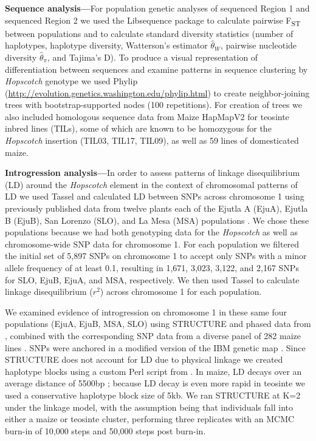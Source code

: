 \documentclass[11pt]{article} %
\begin{document}
\begin{linenumbers}
\begin{flushleft}
\textbf{Sequence analysis---}For population genetic analyses of sequenced Region 1 and sequenced Region 2 we used the  Libsequence package \citep{Thornton2003} to calculate pairwise F\textsubscript{ST} between populations and to calculate standard diversity statistics (number of haplotypes, haplotype diversity, Watterson's estimator $\hat\theta_W$, pairwise nucleotide diversity $\hat\theta_\pi$, and Tajima's D). To produce a visual representation of differentiation between sequences and examine patterns in sequence clustering by \emph{Hopscotch} genotype we used Phylip (\url{http://evolution.genetics.washington.edu/phylip.html}) to create neighbor-joining trees with bootstrap-supported nodes (100 repetitions). For creation of trees we also included homologous sequence data from Maize HapMapV2 \citep{Chia2012} for teosinte inbred lines (TILs), some of which are known to be homozygous for the \emph{Hopscotch} insertion (TIL03, TIL17, TIL09), as well as 59 lines of domesticated maize.

\textbf{Introgression analysis---}In order to assess patterns of linkage disequilibrium (LD) around the \emph{Hopscotch} element in the context of chromosomal patterns of LD we used Tassel \citep{Bradbury2007} and calculated LD between SNPs across chromosome 1 using previously published data from twelve plants each of the Ejutla A (EjuA), Ejutla B (EjuB), San Lorenzo (SLO), and La Mesa (MSA) populations \citep{Pyhajarvi2013}. We chose these populations because we had both genotyping data for the \emph{Hopscotch} as well as chromosome-wide SNP data for chromosome 1. For each population we filtered the initial set of 5,897 SNPs on chromosome 1 to accept only SNPs with a minor allele frequency of at least 0.1, resulting in 1,671, 3,023, 3,122, and 2,167 SNPs for SLO, EjuB, EjuA, and MSA, respectively. We then used Tassel \citep{Bradbury2007} to calculate linkage disequilibrium ($r^{2}$) across chromosome 1 for each population. 

We examined evidence of introgression on chromosome 1 in these same four populations (EjuA, EjuB, MSA, SLO) using STRUCTURE \citep{Falush2003} and phased data from \citet{Pyhajarvi2013}, combined with the corresponding SNP data from a diverse panel of 282 maize lines \citep{Cook2012}. SNPs were anchored in a modified version of the IBM genetic map \citep{Gerke2013}. Since STRUCTURE does not account for LD due to physical linkage we created haplotype blocks using a custom Perl script from \citet[][code available at \url{http://dx.doi.org/10.6084/m9.figshare.1165577}]{Hufford2013}.  In maize, LD decays over an average distance of 5500bp \citep{Chia2012}; because LD decay is even more rapid in teosinte \citep{Chia2012} we used a conservative haplotype block size of 5kb.  We ran STRUCTURE at K=2 under the linkage model, with the assumption being that individuals fall into either a maize or teosinte cluster, performing three replicates with an MCMC burn-in of 10,000 steps and 50,000 steps post burn-in.


\end{flushleft}
\end{linenumbers}
\end{document}
